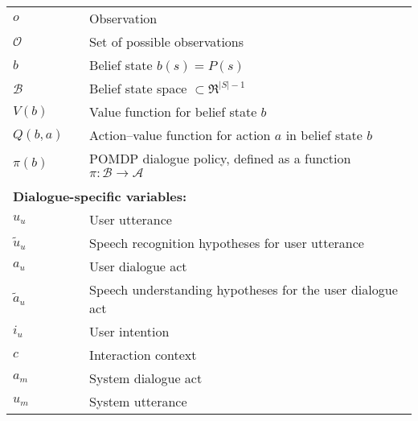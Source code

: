 \begin{longtable}{lp{5mm}p{11cm}}
$o$ && Observation \\
$\mathcal{O}$ && Set of possible observations \\
$b$ && Belief state $b(s) = P(s)$ \\
$\mathcal{B}$ && Belief state space $\subset \Re^{|S|-1}$ \\
$V(b)$ && Value function for belief state $b$  \\
$Q(b,a)$ && Action--value function for action $a$ in belief state $b$ \\
$\pi(b)$ && POMDP dialogue policy, defined as a function $\pi: \mathcal{B} \rightarrow \mathcal{A} $ \\


&&  \vspace{3mm} \\
\multicolumn{3}{l}{\textbf{Dialogue-specific variables:}} \vspace{2mm} \\

$u_u$ && User utterance \\
$\tilde{u}_u$ && Speech recognition hypotheses for user utterance \\
$a_u$ && User dialogue act \\
$\tilde{a}_u$ && Speech understanding hypotheses for the user dialogue act \\
$i_u$ && User intention \\
$c$ && Interaction context \\
$a_m$ && System dialogue act \\
$u_m$ && System utterance \\


\end{longtable}
